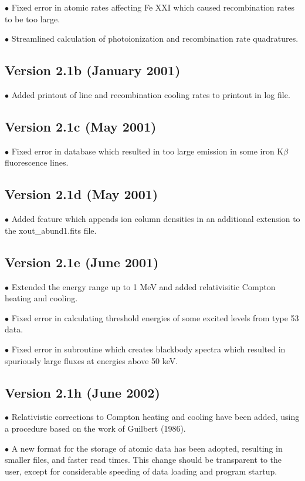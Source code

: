 $\bullet$ Fixed error in atomic rates affecting Fe XXI which caused
recombination rates to be too large.

$\bullet$ Streamlined calculation of photoionization and recombination 
rate quadratures.

\subsection{Version 2.1b (January 2001)}

$\bullet$ Added printout of line and recombination cooling rates to 
printout in log file.

\subsection{Version 2.1c (May 2001)}

$\bullet$ Fixed error in database which resulted in 
too large emission in some iron K$\beta$ fluorescence lines.

\subsection{Version 2.1d (May 2001)}

$\bullet$ Added feature which appends ion column densities 
in an additional extension to the xout\_abund1.fits file.

\subsection{Version 2.1e (June 2001)}

$\bullet$ Extended the energy range up to 1 MeV and added 
relativisitic Compton heating and cooling.

$\bullet$  Fixed error in calculating threshold energies 
of some excited levels from type 53 data.

$\bullet$  Fixed error in subroutine which creates blackbody spectra
which resulted in spuriously large fluxes at energies above 
50 keV.

\subsection{Version 2.1h (June 2002)}

$\bullet$ Relativistic corrections to Compton heating and cooling have been added,
using a procedure based on the work of Guilbert (1986).

$\bullet$ A new format for the storage of atomic data has been adopted, resulting in 
smaller files, and faster read times.  This change should be transparent to the 
user, except for considerable speeding of data loading and program startup. 


